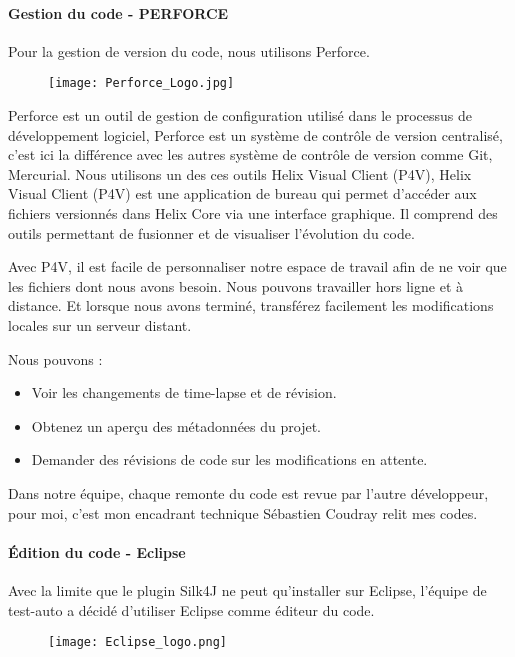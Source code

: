         \paragraph{Gestion du code - PERFORCE}
            \par Pour la gestion de version du code, nous utilisons Perforce.
            \begin{figure}[H]
                \flushleft
                \texttt{[image: Perforce\_Logo.jpg]}
                \label{fig:Perforce_Logo}
            \end{figure}
            \par Perforce est un outil de gestion de configuration utilisé dans le processus de développement logiciel, Perforce est un système de contrôle de version centralisé, c'est ici la différence avec les autres système de contrôle de version comme Git, Mercurial. Nous utilisons un des ces outils Helix Visual Client (P4V), Helix Visual Client (P4V) est une application de bureau qui permet d’accéder aux fichiers versionnés dans Helix Core via une interface graphique. Il comprend des outils permettant de fusionner et de visualiser l'évolution du code.
            \par Avec P4V, il est facile de personnaliser notre espace de travail afin de ne voir que les fichiers dont nous avons besoin. Nous pouvons travailler hors ligne et à distance. Et lorsque nous avons terminé, transférez facilement les modifications locales sur un serveur distant. 
            \par Nous pouvons :
            \begin{itemize}
                \item Voir les changements de time-lapse et de révision. 
                \item Obtenez un aperçu des métadonnées du projet.
                \item Demander des révisions de code sur les modifications en attente.
            \end{itemize} 
            \par Dans notre équipe, chaque remonte du code est revue par l'autre développeur, pour moi, c'est mon encadrant technique Sébastien Coudray relit mes codes. 
            
        \paragraph{Édition du code - Eclipse}
        Avec la limite que le plugin Silk4J ne peut qu'installer sur Eclipse, l'équipe de test-auto a décidé d'utiliser Eclipse comme éditeur du code.
            \begin{figure}[H]
                \flushleft
                \texttt{[image: Eclipse\_logo.png]}
                \label{fig:eclipse_logo}
            \end{figure}
            
